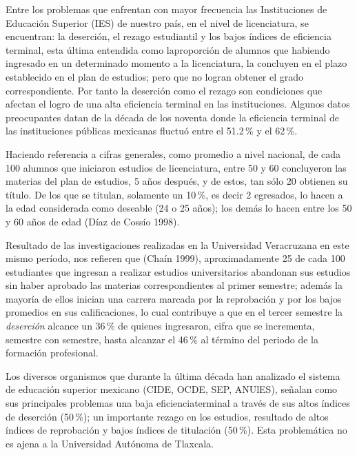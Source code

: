 Entre los problemas que enfrentan con mayor frecuencia las Instituciones de Educación Superior 
(IES) de nuestro país, en el nivel de licenciatura, se encuentran: la deserción, el rezago estudiantil y los bajos índices de eficiencia terminal, esta última entendida como la\linebreak proporción de alumnos que habiendo ingresado en un determinado momento a la licenciatura, la concluyen en el plazo establecido en el plan de estudios; pero que no logran obtener el grado correspondiente. Por tanto la deserción como  el  rezago son  condiciones que  afectan  el  logro de  una  alta eficiencia terminal en las instituciones. Algunos datos preocupantes datan de la década de los noventa donde la eficiencia terminal de las instituciones públicas mexicanas fluctuó entre el 
51.2\,\% y el 62\,\%.

Haciendo referencia a cifras generales, como promedio a nivel nacional, de cada 100 alumnos que iniciaron estudios de licenciatura, entre 50 y 60 concluyeron las materias del plan de estudios, 5 años después, y de estos, tan sólo 20 obtienen su título. De los que se titulan, solamente un 10\,\%, es decir 2 egresados, lo hacen a la edad considerada como deseable (24 o 25 años); los demás lo hacen entre los 50 y 60 años de edad (Díaz de Cossío 1998). 

Resultado de las investigaciones realizadas en la Universidad Veracruzana en este mismo período, nos refieren que (Chaín 1999), aproximadamente 25 de cada 100 estudiantes que ingresan a realizar estudios universitarios abandonan sus  estudios  sin  haber  aprobado  las materias  correspondientes al  primer  semestre; además  la mayoría  de ellos  inician  una carrera  marcada  por la reprobación y por los bajos  promedios   en  sus  calificaciones, lo cual contribuye  a que  en  el tercer semestre   la  \textit{deserción}  alcance  un  36\,\%  de  quienes  ingresaron,  cifra  que  se incrementa, semestre con semestre, hasta alcanzar el 46\,\% al término del periodo de la formación profesional.

Los diversos  organismos  que durante  la última  década  han  analizado el sistema de educación  superior  mexicano  (CIDE,  OCDE,  SEP, ANUlES),  señalan  como  sus principales  problemas  una baja eficiencia\linebreak  terminal  a través  de sus altos  índices  de deserción  (50\,\%);  un importante  rezago  en los estudios,  resultado  de  altos índices de reprobación  y bajos  índices  de titulación 
(50\,\%).  Esta problemática no es ajena a la Universidad Autónoma de Tlaxcala.

